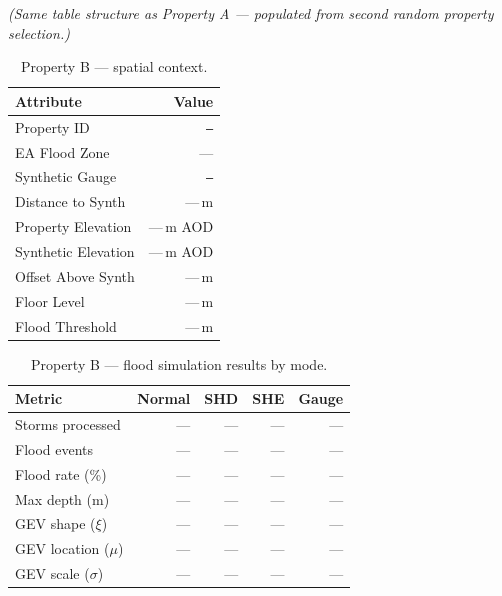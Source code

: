 \documentclass[11pt,a4paper]{article}
\begin{document}
\noindent\textit{(Same table structure as Property A --- populated from second random
property selection.)}

\begin{table}[H]
    \centering
    \caption{Property B --- spatial context.}
    \begin{tabular}{lr}
        \toprule
        \textbf{Attribute} & \textbf{Value} \\
        \midrule
        Property ID          & \texttt{---} \\
        EA Flood Zone        & --- \\
        Synthetic Gauge      & \texttt{---} \\
        Distance to Synth    & ---\,m \\
        Property Elevation   & ---\,m AOD \\
        Synthetic Elevation  & ---\,m AOD \\
        Offset Above Synth   & ---\,m \\
        Floor Level          & ---\,m \\
        Flood Threshold      & ---\,m \\
        \bottomrule
    \end{tabular}
\end{table}

\begin{table}[H]
    \centering
    \caption{Property B --- flood simulation results by mode.}
    \begin{tabular}{lrrrr}
        \toprule
        \textbf{Metric} & \textbf{Normal} & \textbf{SHD} & \textbf{SHE} & \textbf{Gauge} \\
        \midrule
        Storms processed       & --- & --- & --- & --- \\
        Flood events           & --- & --- & --- & --- \\
        Flood rate (\%)        & --- & --- & --- & --- \\
        Max depth (m)          & --- & --- & --- & --- \\
        GEV shape ($\xi$)      & --- & --- & --- & --- \\
        GEV location ($\mu$)   & --- & --- & --- & --- \\
        GEV scale ($\sigma$)   & --- & --- & --- & --- \\
        \bottomrule
    \end{tabular}
\end{table}
\end{document}
